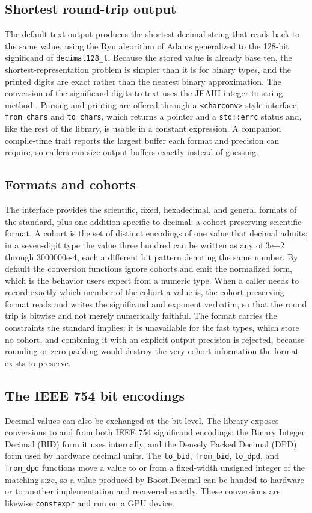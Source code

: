 \documentclass[acmsmall]{acmart}
\begin{document}
\subsection{Shortest round-trip output}
The default text output produces the shortest decimal string that reads back to the same
value, using the Ryu algorithm of Adams \cite{ryu} generalized to the 128-bit
significand of \texttt{decimal128\_t}. Because the stored value is already base ten, the
shortest-representation problem is simpler than it is for binary types, and the printed
digits are exact rather than the nearest binary approximation. The conversion of the
significand digits to text uses the JEAIII integer-to-string method \cite{jeaiii}. Parsing
and printing are offered through a \texttt{<charconv>}-style interface,
\texttt{from\_chars} and
\texttt{to\_chars}, which returns a pointer and a \texttt{std::errc} status and, like the
rest of the library, is usable in a constant expression. A companion compile-time trait
reports the largest buffer each format and precision can require, so callers can size
output buffers exactly instead of guessing.

\subsection{Formats and cohorts}
The interface provides the scientific, fixed, hexadecimal, and general formats of the
standard, plus one addition specific to decimal: a cohort-preserving scientific format. A
cohort is the set of distinct encodings of one value that decimal admits; in a
seven-digit type the value three hundred can be written as any of 3e+2 through
3000000e-4, each a different bit pattern denoting the same number. By default the
conversion functions ignore cohorts and emit the normalized form, which is the behavior
users expect from a numeric type. When a caller needs to record exactly which member of
the cohort a value is, the cohort-preserving format reads and writes the significand and
exponent verbatim, so that the round trip is bitwise and not merely numerically faithful.
The format carries the constraints the standard implies: it is unavailable for the fast
types, which store no cohort, and combining it with an explicit output precision is
rejected, because rounding or zero-padding would destroy the very cohort information the
format exists to preserve.

\subsection{The IEEE 754 bit encodings}
Decimal values can also be exchanged at the bit level. The library exposes conversions to
and from both IEEE 754 significand encodings: the Binary Integer Decimal (BID) form it
uses internally, and the Densely Packed Decimal (DPD) form used by hardware decimal
units. The \texttt{to\_bid}, \texttt{from\_bid}, \texttt{to\_dpd}, and \texttt{from\_dpd}
functions move a value to or from a fixed-width unsigned integer of the matching size, so
a value produced by Boost.Decimal can be handed to hardware or to another implementation
and recovered exactly. These conversions are likewise \texttt{constexpr} and run on a GPU
device.
\end{document}
